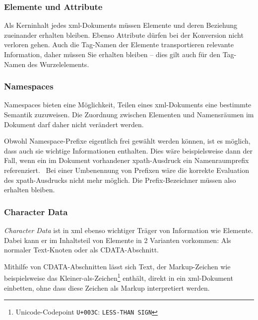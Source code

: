 


\subsubsection{Elemente und Attribute}

Als Kerninhalt jedes \acrshort{xml}\hyp{}Dokuments müssen Elemente und deren Beziehung zueinander erhalten bleiben. Ebenso Attribute dürfen bei der Konversion nicht verloren gehen. Auch die Tag\hyp{}Namen der Elemente transportieren relevante Information, daher müssen Sie erhalten bleiben -- dies gilt auch für den Tag\hyp{}Namen des Wurzelelements.

\subsubsection{Namespaces}

Namespaces bieten eine Möglichkeit, Teilen eines \acrshort{xml}-Dokuments eine bestimmte Semantik zuzuweisen. Die Zuordnung zwischen Elementen und Namensräumen im Dokument darf daher nicht verändert werden.

Obwohl Namespace\hyp{}Prefixe eigentlich frei gewählt werden können, ist es möglich, dass auch sie wichtige Informationen enthalten. Dies wäre beispielsweise dann der Fall, wenn ein im Dokument vorhandener \acrshort{xpath}\hyp{}Ausdruck ein Namenraumprefix referenziert.~\cite[Abschn. 4.4]{boyer2001c14n} Bei einer Umbenennung von Prefixen wäre die korrekte Evaluation des \acrshort{xpath}\hyp{}Ausdrucks nicht mehr möglich. Die Prefix-Bezeichner müssen also erhalten bleiben.

\subsubsection{Character Data}
\label{sec:cdata}

\emph{Character Data} ist in \acrshort{xml} ebenso wichtiger Träger von Information wie Elemente. Dabei kann er im Inhaltsteil von Elemente in 2 Varianten vorkommen: Als normaler Text-Knoten oder als CDATA-Abschnitt.

Mithilfe von CDATA-Abschnitten lässt sich Text, der Markup-Zeichen wie beispielsweise das Kleiner-als-Zeichen\footnote{Unicode-Codepoint \texttt{U+003C}: \texttt{LESS-THAN SIGN}} enthält, direkt in ein \acrshort{xml}-Dokument einbetten, ohne dass diese Zeichen als Markup interpretiert werden.

